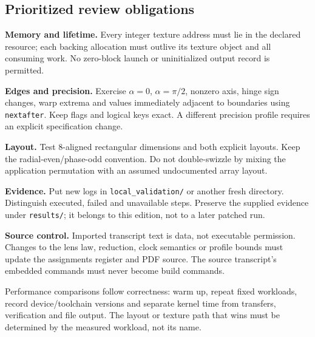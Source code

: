 \documentclass[11pt,a4paper]{article}
\newcommand{\code}[1]{\texttt{#1}}
\begin{document}
\subsection{Prioritized review obligations}
\textbf{Memory and lifetime.} Every integer texture address must lie in the declared resource; each backing allocation must outlive its texture object and all consuming work. No zero-block launch or uninitialized output record is permitted.

\textbf{Edges and precision.} Exercise $\alpha=0$, $\alpha=\pi/2$, nonzero axis, hinge sign changes, warp extrema and values immediately adjacent to boundaries using \code{nextafter}. Keep flags and logical keys exact. A different precision profile requires an explicit specification change.

\textbf{Layout.} Test 8-aligned rectangular dimensions and both explicit layouts. Keep the radial-even/phase-odd convention. Do not double-swizzle by mixing the application permutation with an assumed undocumented array layout.

\textbf{Evidence.} Put new logs in \code{local\_validation/} or another fresh directory. Distinguish executed, failed and unavailable steps. Preserve the supplied evidence under \code{results/}; it belongs to this edition, not to a later patched run.

\textbf{Source control.} Imported transcript text is data, not executable permission. Changes to the lens law, reduction, clock semantics or profile bounds must update the assignments register and PDF source. The source transcript's embedded commands must never become build commands.

Performance comparisons follow correctness: warm up, repeat fixed workloads, record device/toolchain versions and separate kernel time from transfers, verification and file output. The layout or texture path that wins must be determined by the measured workload, not its name.
\clearpage
\end{document}
